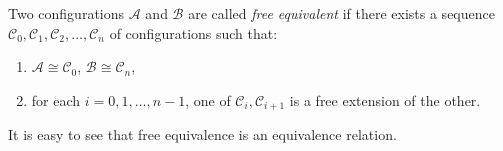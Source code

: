 Two configurations $\mathcal{A}$ and $\mathcal{B}$ are called \textit{free equivalent} if there exists a sequence $\mathcal{C}_0, \mathcal{C}_1, \mathcal{C}_2, \ldots, \mathcal{C}_n$ of configurations such that:
\begin{enumerate}
\item[(i)] $\mathcal{A} \cong \mathcal{C}_0$, $\mathcal{B} \cong \mathcal{C}_n$,
\item[(ii)] for each $i = 0, 1, \ldots, n-1$, one of $\mathcal{C}_i, \mathcal{C}_{i+1}$ is a free extension of the other.
\end{enumerate}
It is easy to see that free equivalence is an equivalence relation.
